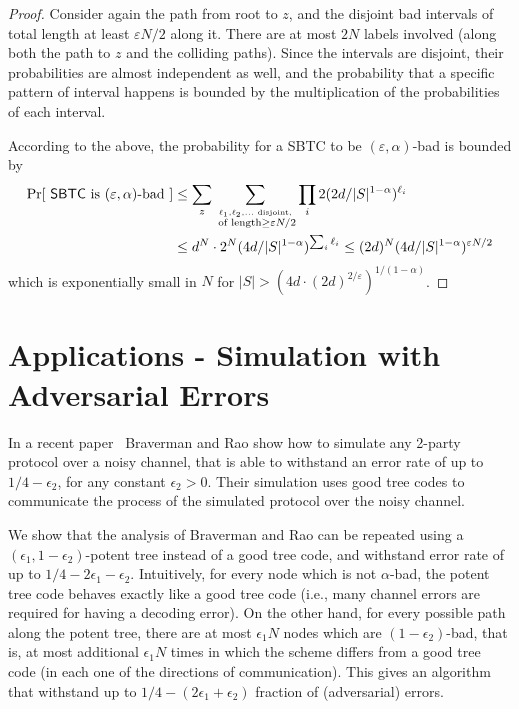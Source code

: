 \documentclass[ letterpaper, 11pt]{article}
\newcommand{\eps}{\varepsilon}
\newcommand{\KTC}{\textsf{SBTC}\xspace}
\begin{document}
\begin{proof}
Consider again the path from root to $z$, and the disjoint
bad intervals of total length at least $\varepsilon N/2$ along it.
There are at most $2N$ labels involved (along both the path to $z$ and the colliding paths).
Since the intervals are disjoint, their probabilities are almost independent as well, and
the probability that a specific pattern of interval happens is bounded by the
multiplication of the probabilities of each interval.


According to the above, 
the probability for a \KTC to be $(\varepsilon,\alpha)$-bad is bounded by
\begin{align*}
\Pr[\text{ \KTC is $(\varepsilon,\alpha)$-bad }] &\le \sum_{z}
\sum_{\stackrel{\ell_1,\ell_2, \ldots \text{ disjoint,}}{\text{ of length} \ge \eps N/2}}
\prod_i 2(2d/|S|^{1-\alpha})^{\ell_i}  \\ &
\le d^N \cdot 2^N (4d/|S|^{1-\alpha})^{\sum_i \ell_i} \le (2d)^N (4d/|S|^{1-\alpha})^{\eps N/2}
\end{align*}
which is exponentially small in $N$ for $|S|> (4d\cdot(2d)^{2/\eps})^{1/(1-\alpha)}$.
\end{proof}


\section{Applications - Simulation with Adversarial Errors}\label{sec:appBR}
In a recent paper~\cite{BR10} Braverman and Rao show how to simulate
any 2-party protocol over a noisy channel, that is able to withstand an error
rate of up to $1/4-\epsilon_2$, for any constant $\epsilon_2>0$.
Their simulation uses good tree codes to communicate
the process of the simulated protocol over the noisy channel.

We show that the analysis of Braverman and Rao
can be repeated using a $(\epsilon_1,1-\epsilon_2)$-potent tree instead of a good tree code,
and withstand error rate of up to $1/4-2\epsilon_1-\epsilon_2$.
Intuitively, for every node which is not $\alpha$-bad, the potent tree code behaves
exactly like a good tree code (i.e., many channel errors are required for having a decoding error).
On the other hand, for every possible path along the potent tree,
there are at most $\epsilon_1N$ nodes which are $(1-\epsilon_2)$-bad, that is,
at most additional $\epsilon_1N$ times in which the scheme differs from a good tree code (in each one of the directions of communication).
This gives an algorithm that withstand up to $1/4-(2\epsilon_1+\epsilon_2)$
fraction of (adversarial) errors.
\end{document}
